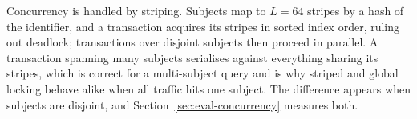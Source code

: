 Concurrency is handled by striping. Subjects map to $L=64$ stripes by a hash of
the identifier, and a transaction acquires its stripes in sorted index order,
ruling out deadlock; transactions over disjoint subjects then proceed in parallel. A transaction spanning many subjects serialises against everything sharing its
stripes, which is correct for a multi-subject query and is why striped and global
locking behave alike when all traffic hits one subject. The difference appears
when subjects are disjoint, and Section~\ref{sec:eval-concurrency} measures
both.
